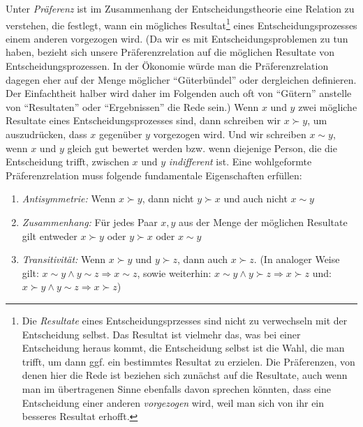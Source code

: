 Unter {\em Präferenz} ist im Zusammenhang der Entscheidungstheorie eine Relation
zu verstehen, die festlegt, wann ein mögliches Resultat\footnote{Die {\em
Resultate} eines Entscheidungsprzesses sind nicht zu verwechseln mit der
Entscheidung selbst. Das Resultat ist vielmehr das, was bei einer Entscheidung
heraus kommt, die Entscheidung selbst ist die Wahl, die man trifft, um dann ggf.
ein bestimmtes Resultat zu erzielen. Die Präferenzen, von denen hier die Rede ist
beziehen sich zunächst auf die Resultate, auch wenn man im übertragenen Sinne
ebenfalls davon sprechen könnten, dass eine Entscheidung einer anderen {\em
vorgezogen} wird, weil man sich von ihr ein besseres Resultat erhofft.} eines
Entscheidungsprozesses einem anderen vorgezogen wird. (Da wir es mit
Entscheidungsproblemen zu tun haben, bezieht sich unsere Präferenzrelation auf
die möglichen Resultate von Entscheidungsprozessen. In der Ökonomie würde man die
Präferenzrelation dagegen eher auf der Menge möglicher "`Güterbündel"' oder
dergleichen definieren. Der Einfachtheit halber wird daher im Folgenden auch oft
von "`Gütern"' anstelle von "`Resultaten"' oder "`Ergebnissen"' die Rede sein.)
Wenn $x$ und $y$ zwei mögliche Resultate eines Entscheidungsprozesses sind, dann
schreiben wir $x \succ y$, um auszudrücken, dass $x$ gegenüber $y$ vorgezogen
wird. Und wir schreiben $x \sim y$, wenn $x$ und $y$ gleich gut bewertet werden
bzw. wenn diejenige Person, die die Entscheidung trifft, zwischen $x$ und $y$
{\em indifferent} ist. Eine wohlgeformte Präferenzrelation muss folgende
fundamentale Eigenschaften erfüllen:

\begin{enumerate}
\label{Ordnungsaxiome}
\item {\em Antisymmetrie:} Wenn $x \succ y$, dann nicht $y \succ x$ und auch
nicht $x \sim y$
\item {\em Zusammenhang:} Für jedes Paar $x, y$ aus der
Menge der möglichen Resultate gilt entweder $x \succ y$ oder $y \succ x$ 
oder $x \sim y$
\item {\em Transitivität:} Wenn $x \succ y$ und $y \succ z$, dann auch $x
\succ z$. (In analoger Weise gilt: $x \sim y \wedge y \sim z \Rightarrow x
\sim z$, sowie weiterhin: $x \sim y \wedge y \succ z \Rightarrow x \succ z$ und:
$x \succ y \wedge y \sim z \Rightarrow x \succ z$)
\end{enumerate}

